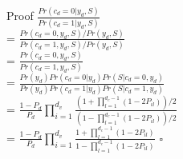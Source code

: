 \def\CTeXPreproc{Created by ctex v0.2.12, don't edit!}\documentclass{beamer}
\begin{document}
\begin{frame}
    \begin{block}{Proof}
        \Large{
          $\frac{Pr(c_d = 0|y_d, S)}{Pr(c_d = 1|y_d, S)}$\\
        = $\frac{Pr(c_d=0,y_d,S)/Pr(y_d,S)}{Pr(c_d=1,y_d,S)/Pr(y_d,S)}$\\
        = $\frac{Pr(c_d=0,y_d,S)}{Pr(c_d=1,y_d,S)}$\\
        = $\frac{Pr(y_d)Pr(c_d=0|y_d)Pr(S|c_d=0,y_d)}{Pr(y_d)Pr(c_d=1|y_d)Pr(S|c_d=1,y_d)}$\\
        = $\frac{1-P_d}{P_d}\prod_{i=1}^{d_v}\frac{(1+\prod_{l=1}^{d_c-1}(1-2P_{il}))/2}{(1-\prod_{l=1}^{d_c-1}(1-2P_{il}))/2}$\\
        = $\frac{1-P_d}{P_d}\prod_{i=1}^{d_v}\frac{1+\prod_{l=1}^{d_c-1}(1-2P_{il})}{1-\prod_{l=1}^{d_c-1}(1-2P_{il})}$
        }\quad \quad \quad \quad \quad \quad \quad \quad \quad $\square$
    \end{block}
\end{frame}
\end{document}
